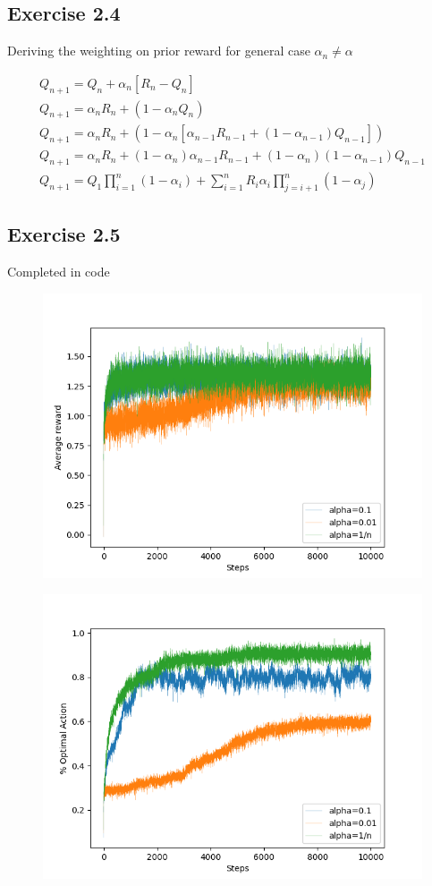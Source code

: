 \subsection{Exercise 2.4}
Deriving the weighting on prior reward for general case $\alpha_n \not= \alpha$

\begin{gather}
  Q_{n+1} = Q_n + \alpha_n[R_n - Q_n] \\
  Q_{n+1} = \alpha_nR_n + (1-\alpha_nQ_n) \\
  Q_{n+1} = \alpha_nR_n + (1-\alpha_n[\alpha_{n-1}R_{n-1} + (1-\alpha_{n-1})Q_{n-1}]) \\
  Q_{n+1} = \alpha_nR_n + (1-\alpha_n)\alpha_{n-1}R_{n-1} + (1-\alpha_n)(1-\alpha_{n-1})Q_{n-1} \\
  Q_{n+1} = Q_1\prod\limits_{i=1}^n(1-\alpha_i) + \sum\limits_{i=1}^nR_i\alpha_i\prod\limits_{j=i+1}^n(1-\alpha_j)
\end{gather}

\subsection{Exercise 2.5}
Completed in code


\begin{figure}[htbp]
  \centering
  \includegraphics{../../code/figures/exercise2_5a.png}
\end{figure}

\begin{figure}[htbp]
  \centering
  \includegraphics{../../code/figures/exercise2_5b.png}
\end{figure}
